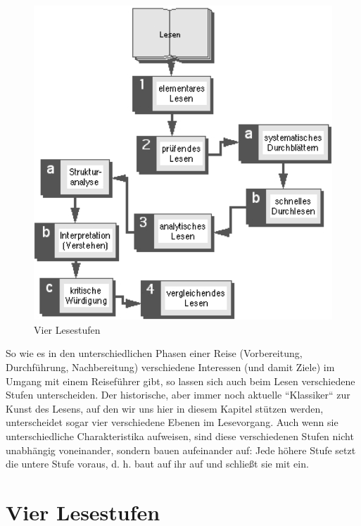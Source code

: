 \documentclass[]{book}
\theoremstyle{definition}
\theoremstyle{definition}
\theoremstyle{definition}
\theoremstyle{remark}
\begin{document}
\begin{figure}

{\centering \includegraphics{images/lesen-4-stufen-min} 

}

\caption{Vier Lesestufen}\label{fig:unnamed-chunk-16}
\end{figure}

So wie es in den unterschiedlichen Phasen einer Reise (Vorbereitung,
Durchführung, Nachbereitung) verschiedene Interessen (und damit Ziele)
im Umgang mit einem Reiseführer gibt, so lassen sich auch beim Lesen
verschiedene Stufen unterscheiden. Der historische, aber immer noch
aktuelle ``Klassiker`` zur Kunst des Lesens, auf den wir uns hier in
diesem Kapitel stützen werden, unterscheidet sogar vier verschiedene
Ebenen im Lesevorgang. Auch wenn sie unterschiedliche Charakteristika
aufweisen, sind diese verschiedenen Stufen nicht unabhängig voneinander,
sondern bauen aufeinander auf: Jede höhere Stufe setzt die untere Stufe
voraus, d. h. baut auf ihr auf und schließt sie mit ein.

\section{Vier Lesestufen}\label{vier-lesestufen}
\end{document}
